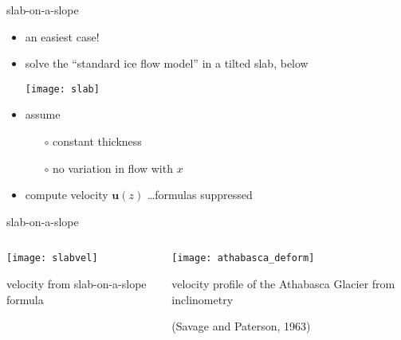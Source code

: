 \documentclass[hide notes,intlimits]{beamer}
\begin{document}
\begin{frame}{slab-on-a-slope}

\begin{itemize}
\item an easiest case!
\item solve the ``standard ice flow model'' in a tilted slab, below

\begin{center}
\texttt{[image: slab]}
\end{center}

\vspace{-0.5in}
\item assume
  \begin{itemize}
  \item[$\circ$] constant thickness
  \item[$\circ$] no variation in flow with $x$
  \end{itemize}
\item compute velocity $\mathbf{u}(z)$ \dots formulas suppressed
\end{itemize}
\end{frame}


\begin{frame}{slab-on-a-slope}
\vspace{-1em}

\begin{columns}
\begin{column}{0.55\textwidth}
\begin{center}
\texttt{[image: slabvel]}

\medskip
\scriptsize
velocity from slab-on-a-slope formula
\end{center}
\end{column}

\begin{column}{0.45\textwidth}
\texttt{[image: athabasca\_deform]}

\medskip
\scriptsize
velocity profile of the Athabasca Glacier from inclinometry

\tiny (Savage and Paterson, 1963)
\end{column}
\end{columns}
\end{frame}
\end{document}
